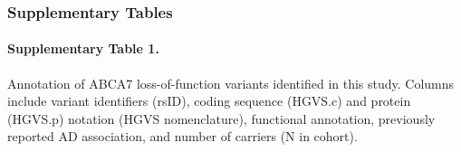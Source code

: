 \subsubsection*{Supplementary Tables}
{}

\captionsetup{justification=raggedright,singlelinecheck=false}
\renewcommand{\thetable}{S\arabic{table}}
\setcounter{table}{0}  

\renewcommand{\arraystretch}{1.2} 


\paragraph*{Supplementary Table 1.} Annotation of ABCA7 loss-of-function variants identified in this study. Columns include variant identifiers (rsID), coding sequence (HGVS.c) and protein (HGVS.p) notation (HGVS nomenclature), functional annotation, previously reported AD association, and number of carriers (N in cohort).
{}

